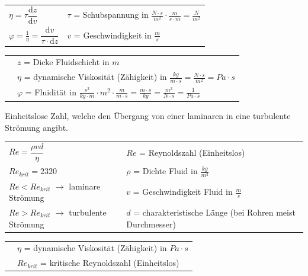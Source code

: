 			\begin{minipage}{12cm}
				\renewcommand{\arraystretch}{2.5}
				\begin{tabular}{ p{4cm} | p{7cm}}
					$\eta = \tau \dfrac{\mathrm{d}z}{\mathrm{d}v}$	&	$\tau$ = Schubspannung in $\frac{N \cdot s}{m^2} \cdot \frac{m}{s \cdot m} = \frac{N}{m^2}$\\
					$\varphi = \frac{1}{\eta} = \dfrac{\mathrm{d}v}{\tau \cdot \mathrm{d}z}$	& $v$ = Geschwindigkeit in $\frac{m}{s}$\\
				\end{tabular}
				\renewcommand{\arraystretch}{1.5}
				\begin{tabular}{ p{4cm} | p{10cm} }
					& $z$ = Dicke Fluidschicht in $m$\\
					& $\eta$ = dynamische Viskosität (Zähigkeit) in $\frac{kg}{m \cdot s} = \frac{N \cdot s}{m^2} = Pa \cdot s$\\
					& $\varphi$ = Fluidität in $\frac{s^2}{kg \cdot m} \cdot m^2 \cdot \frac{m}{m \cdot s} = \frac{m \cdot s}{kg} = \frac{m^2}{N \cdot s} = \frac{1}{Pa \cdot s}$\\
				\end{tabular} 
				\renewcommand{\arraystretch}{1}
			\end{minipage}
			\newline
			\newline
			\newline
			\begin{minipage}[t]{16cm}
				\begin{flushleft}
					Einheitslose Zahl, welche den Übergang von einer laminaren in eine turbulente Strömung angibt.
				\end{flushleft}
				\renewcommand{\arraystretch}{2.5}
				\begin{tabular}{ p{6cm} | p{10cm}}
					$Re = \dfrac{\rho v d}{\eta}$	&	$Re$ = Reynoldszahl (Einheitslos)\\
					$Re_{krit} = 2320$	&	$\rho$ = Dichte Fluid in $\frac{kg}{m^3}$\\
					$Re < Re_{krit}$ \quad $\rightarrow$ laminare Strömung & $v$ = Geschwindigkeit Fluid in $\frac{m}{s}$\\
					$Re > Re_{krit}$ \quad $\rightarrow$ turbulente Strömung & $d$ = charakteristische Länge (bei Rohren meist Durchmesser)\\
				\end{tabular}
				\renewcommand{\arraystretch}{1.5}
				\begin{tabular}{ p{6cm} | p{10cm} }
					& $\eta$ = dynamische Viskosität (Zähigkeit) in $Pa \cdot s$\\
					& $Re_{krit}$ = kritische Reynoldszahl (Einheitslos)\\
				\end{tabular} 
				\renewcommand{\arraystretch}{1}
			\end{minipage}
			
